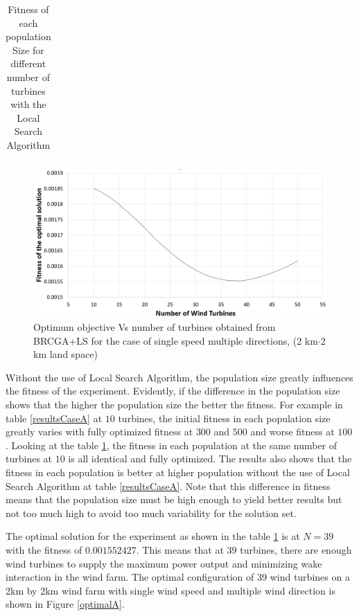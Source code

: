 \begin{table}[H]
\begin{tabular}{|c|c|c|c|c|c|}
        \end{tabular}
        \caption{Fitness of each population Size for different number of turbines with the Local Search Algorithm}
        \label{resultsCaseA2}
    \end{table}
    \doublespacing
    
    \begin{figure}[H]
        \centering
        \includegraphics[width=\textwidth]{Figures/graphA.png}
        \caption{Optimum objective Vs number of turbines obtained from BRCGA+LS for the case of single speed multiple directions, (2 km$\cdot$2 km land space)}
        \label{graphA}
    \end{figure}
    
    Without the use of Local Search Algorithm, the population size greatly influences the fitness of the experiment. Evidently, if the difference in the population size shows that the higher the population size the better the fitness. For example in table \ref{resultsCaseA} at $10$ turbines, the initial fitness in each population size greatly varies with fully optimized fitness at $300$ and $500$ and worse fitness at $100$. Looking at the table \ref{resultsCaseA2}, the fitness in each population at the same number of turbines at $10$ is all identical and fully optimized. The results also shows that the fitness in each population is better at higher population without the use of Local Search Algorithm at table \ref{resultsCaseA}. Note that this difference in fitness means that the population size must be high enough to yield better results but not too much high to avoid too much variability for the solution set.
    
    The optimal solution for the experiment as shown in the table \ref{resultsCaseA2} is at $N = 39$ with the fitness of $0.001552427$. This means that at $39$ turbines, there are enough wind turbines to supply the maximum power output and minimizing wake interaction in the wind farm. The optimal configuration of 39 wind turbines on a 2km by 2km wind farm with single wind speed and multiple wind direction is shown in Figure \ref{optimalA}.

